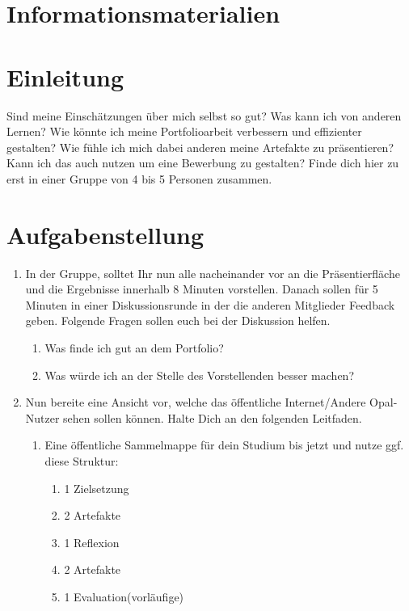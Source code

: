 \documentclass[a4paper,oneside]{scrarticle}
\begin{document}
	\pagebreak 
	
	\section*{Informationsmaterialien}
	
	
	
	
	
	\pagebreak
	
	\section*{Einleitung}
	Sind meine Einschätzungen über mich selbst so gut? Was kann ich von anderen Lernen? Wie könnte ich meine Portfolioarbeit verbessern und effizienter gestalten? Wie fühle ich mich dabei anderen meine Artefakte zu präsentieren? Kann ich das auch nutzen um eine Bewerbung zu gestalten? Finde dich hier zu erst in einer Gruppe von 4 bis 5 Personen zusammen.
	
	\section*{Aufgabenstellung}

	\begin{enumerate}
		\item In der Gruppe, solltet Ihr nun alle nacheinander vor an die Präsentierfläche und die Ergebnisse innerhalb 8 Minuten vorstellen. Danach sollen für 5 Minuten in einer Diskussionsrunde in der die anderen Mitglieder Feedback geben. Folgende Fragen sollen euch bei der Diskussion helfen. 
		\begin{enumerate}
			\item Was finde ich gut an dem Portfolio?
			\item Was würde ich an der Stelle des Vorstellenden besser machen?
		\end{enumerate}
		\item Nun bereite eine Ansicht vor, welche das öffentliche Internet/Andere Opal-Nutzer sehen sollen können. Halte Dich an den folgenden Leitfaden.
		\begin{enumerate}
			\item Eine öffentliche Sammelmappe für dein Studium bis jetzt und nutze ggf. diese Struktur:
			\begin{enumerate}
				\item 1 Zielsetzung
				\item 2 Artefakte
				\item 1 Reflexion
				\item 2 Artefakte
				\item 1 Evaluation(vorläufige)
			\end{enumerate}
		\end{enumerate}

	\end{enumerate}
\end{document}
